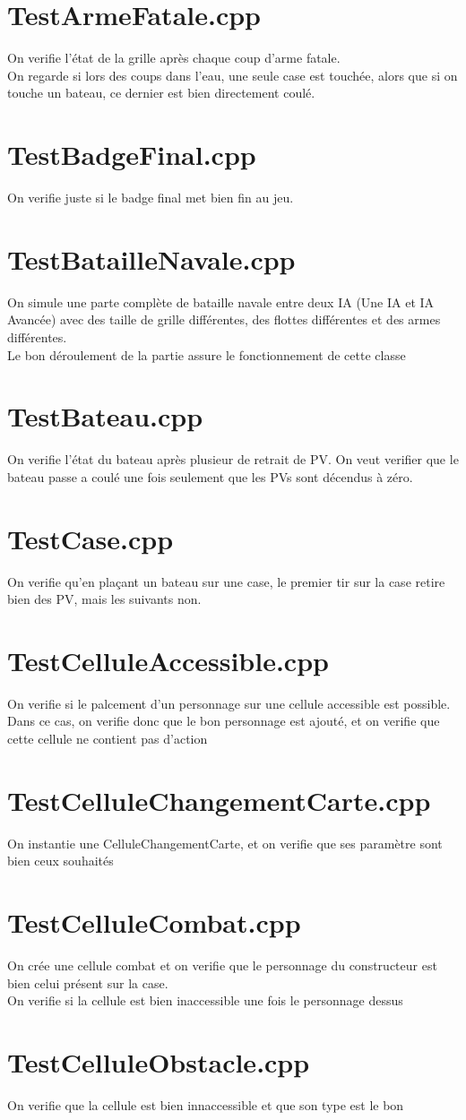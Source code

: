     \section{TestArmeFatale.cpp}
        On verifie l'état de la grille après chaque coup d'arme fatale.\\
        On regarde si lors des coups dans l'eau, une seule case est touchée, alors que si on touche un bateau, ce dernier est bien directement coulé.
    \section{TestBadgeFinal.cpp}
        On verifie juste si le badge final met bien fin au jeu.
    \section{TestBatailleNavale.cpp}
        On simule une parte complète de bataille navale entre deux IA (Une IA et IA Avancée) avec des taille de grille différentes, des flottes différentes et des armes différentes.\\
        Le bon déroulement de la partie assure le fonctionnement de cette classe
    \section{TestBateau.cpp}
        On verifie l'état du bateau après plusieur de retrait de PV. On veut verifier que le bateau passe a coulé une fois seulement que les PVs sont décendus à zéro.
    \section{TestCase.cpp}
        On verifie qu'en plaçant un bateau sur une case, le premier tir sur la case retire bien des PV, mais les suivants non.
    \section{TestCelluleAccessible.cpp}
        On verifie si le palcement d'un personnage sur une cellule accessible est possible.\\
        Dans ce cas, on verifie donc que le bon personnage est ajouté, et on verifie que cette cellule ne contient pas d'action
    \section{TestCelluleChangementCarte.cpp}
        On instantie une CelluleChangementCarte, et on verifie que ses paramètre sont bien ceux souhaités
    \section{TestCelluleCombat.cpp}
        On crée une cellule combat et on verifie que le personnage du constructeur est bien celui présent sur la case.\\
        On verifie si la cellule est bien inaccessible une fois le personnage dessus
    \section{TestCelluleObstacle.cpp}
        On verifie que la cellule est bien innaccessible et que son type est le bon
